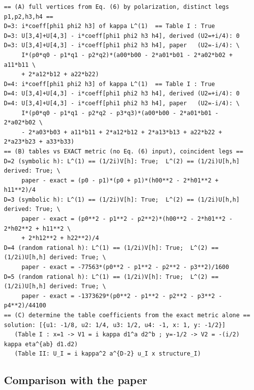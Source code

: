 \begin{center}
\begin{minipage}{0.99\linewidth}
\scriptsize
\begin{verbatim}
== (A) full vertices from Eq. (6) by polarization, distinct legs p1,p2,h3,h4 ==
D=3: i*coeff[phi1 phi2 h3] of kappa L^(1)  == Table I : True
D=3: U[3,4]+U[4,3] - i*coeff[phi1 phi2 h3 h4], derived (U2=+i/4): 0
D=3: U[3,4]+U[4,3] - i*coeff[phi1 phi2 h3 h4], paper   (U2=-i/4): \
     I*(p0*q0 - p1*q1 - p2*q2)*(a00*b00 - 2*a01*b01 - 2*a02*b02 + a11*b11 \
     + 2*a12*b12 + a22*b22)
D=4: i*coeff[phi1 phi2 h3] of kappa L^(1)  == Table I : True
D=4: U[3,4]+U[4,3] - i*coeff[phi1 phi2 h3 h4], derived (U2=+i/4): 0
D=4: U[3,4]+U[4,3] - i*coeff[phi1 phi2 h3 h4], paper   (U2=-i/4): \
     I*(p0*q0 - p1*q1 - p2*q2 - p3*q3)*(a00*b00 - 2*a01*b01 - 2*a02*b02 \
     - 2*a03*b03 + a11*b11 + 2*a12*b12 + 2*a13*b13 + a22*b22 + 2*a23*b23 + a33*b33)
== (B) tables vs EXACT metric (no Eq. (6) input), coincident legs ==
D=2 (symbolic h): L^(1) == (1/2i)V[h]: True;  L^(2) == (1/2i)U[h,h] derived: True; \
     paper - exact = (p0 - p1)*(p0 + p1)*(h00**2 - 2*h01**2 + h11**2)/4
D=3 (symbolic h): L^(1) == (1/2i)V[h]: True;  L^(2) == (1/2i)U[h,h] derived: True; \
     paper - exact = (p0**2 - p1**2 - p2**2)*(h00**2 - 2*h01**2 - 2*h02**2 + h11**2 \
     + 2*h12**2 + h22**2)/4
D=4 (random rational h): L^(1) == (1/2i)V[h]: True;  L^(2) == (1/2i)U[h,h] derived: True; \
     paper - exact = -77563*(p0**2 - p1**2 - p2**2 - p3**2)/1600
D=5 (random rational h): L^(1) == (1/2i)V[h]: True;  L^(2) == (1/2i)U[h,h] derived: True; \
     paper - exact = -1373629*(p0**2 - p1**2 - p2**2 - p3**2 - p4**2)/44100
== (C) determine the table coefficients from the exact metric alone ==
solution: [{u1: -1/8, u2: 1/4, u3: 1/2, u4: -1, x: 1, y: -1/2}]
   (Table I : x=1 -> V1 = i kappa d1^a d2^b ; y=-1/2 -> V2 = -(i/2) kappa eta^{ab} d1.d2)
   (Table II: U_I = i kappa^2 a^{D-2} u_I x structure_I)
\end{verbatim}
\end{minipage}
\end{center}

\subsection{Comparison with the paper}
\label{sec:ch1-t2-compare}

